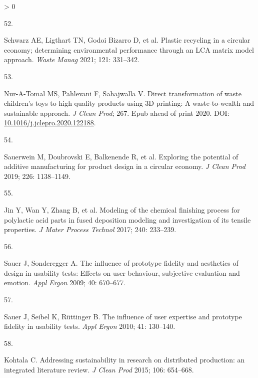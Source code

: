 \documentclass[
  12pt]{article}
\newlength{\cslhangindent}
\newlength{\csllabelwidth}
\newenvironment{CSLReferences}[2] %
 {%
  \setlength{\parindent}{0pt}
  \ifodd #1 \everypar{\setlength{\hangindent}{\cslhangindent}}\ignorespaces\fi
  \ifnum #2 > 0
  \setlength{\parskip}{#2\baselineskip}
  \fi
 }%
 {}
\newcommand{\CSLLeftMargin}[1]{\parbox[t]{\csllabelwidth}{#1}}
\newcommand{\CSLRightInline}[1]{\parbox[t]{\linewidth - \csllabelwidth}{#1}\break}
\begin{document}
\begin{CSLReferences}{0}{0}
\leavevmode\hypertarget{ref-Schwarz2021}{}%
\CSLLeftMargin{52. }
\CSLRightInline{Schwarz AE, Ligthart TN, Godoi Bizarro D, et al. {Plastic recycling in a circular economy; determining environmental performance through an LCA matrix model approach}. \emph{Waste Manag} 2021; 121: 331--342.}

\leavevmode\hypertarget{ref-Nur-A-Tomal2020}{}%
\CSLLeftMargin{53. }
\CSLRightInline{Nur-A-Tomal MS, Pahlevani F, Sahajwalla V. {Direct transformation of waste children's toys to high quality products using 3D printing: A waste-to-wealth and sustainable approach}. \emph{J Clean Prod}; 267. Epub ahead of print 2020. DOI: \href{https://doi.org/10.1016/j.jclepro.2020.122188}{10.1016/j.jclepro.2020.122188}.}

\leavevmode\hypertarget{ref-Sauerwein2019}{}%
\CSLLeftMargin{54. }
\CSLRightInline{Sauerwein M, Doubrovski E, Balkenende R, et al. {Exploring the potential of additive manufacturing for product design in a circular economy}. \emph{J Clean Prod} 2019; 226: 1138--1149.}

\leavevmode\hypertarget{ref-Jin2017}{}%
\CSLLeftMargin{55. }
\CSLRightInline{Jin Y, Wan Y, Zhang B, et al. {Modeling of the chemical finishing process for polylactic acid parts in fused deposition modeling and investigation of its tensile properties}. \emph{J Mater Process Technol} 2017; 240: 233--239.}

\leavevmode\hypertarget{ref-Sauer2009}{}%
\CSLLeftMargin{56. }
\CSLRightInline{Sauer J, Sonderegger A. {The influence of prototype fidelity and aesthetics of design in usability tests: Effects on user behaviour, subjective evaluation and emotion}. \emph{Appl Ergon} 2009; 40: 670--677.}

\leavevmode\hypertarget{ref-Sauer2010}{}%
\CSLLeftMargin{57. }
\CSLRightInline{Sauer J, Seibel K, Rüttinger B. {The influence of user expertise and prototype fidelity in usability tests}. \emph{Appl Ergon} 2010; 41: 130--140.}

\leavevmode\hypertarget{ref-Kohtala2015a}{}%
\CSLLeftMargin{58. }
\CSLRightInline{Kohtala C. {Addressing sustainability in research on distributed production: an integrated literature review}. \emph{J Clean Prod} 2015; 106: 654--668.}

\end{CSLReferences}
\end{document}
